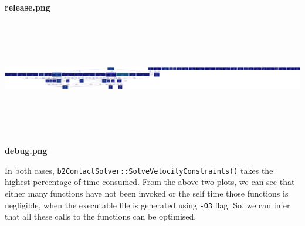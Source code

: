 \documentclass[11pt]{article}
\begin{document}
\centerline{\bf release.png}



\includegraphics[width=7.7in,height=2in]{./debug.png}

\centerline{\bf debug.png}

In both cases, {\tt b2ContactSolver::SolveVelocityConstraints()} takes the highest percentage of time consumed. From the above two plots, we can see that either many functions have not been invoked or the self time those functions is negligible, when the executable file is generated using {\tt -O3} flag. So, we can infer that all these calls to the functions can be optimised. 
\end{document}

